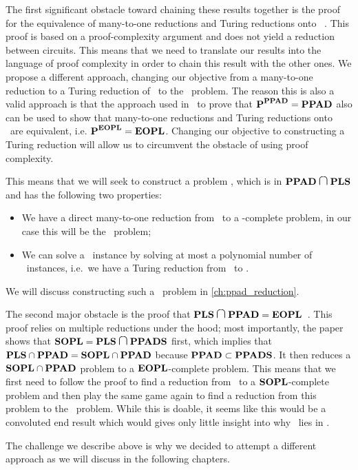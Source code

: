 The first significant obstacle toward chaining these results together is the proof for the equivalence of many-to-one reductions and Turing reductions onto \PPAD\ . This proof is based on a proof-complexity argument and does not yield a reduction between circuits. This means that we need to translate our results into the language of proof complexity in order to chain this result with the other ones. We propose a different approach, changing our objective from a many-to-one reduction to a Turing reduction of \Tarski\ to the \EndOfPotentialLine\ problem. The reason this is also a valid approach is that the approach used in~\cite{buss_propositional_2012} to prove that $\textbf{P}^{\textbf{PPAD}} = \textbf{PPAD}$ also can be used to show that many-to-one reductions and Turing reductions onto \EOPL\ are equivalent, i.e. $\textbf{P}^{\textbf{EOPL}} = \textbf{EOPL}$. Changing our objective to constructing a Turing reduction will allow us to circumvent the obstacle of using proof complexity.

This means that we will seek to construct a problem \Tarskistar, which is in $\PPAD  \medcap \PLS$ and has the following two properties:
\begin{itemize}
	\item We have a direct many-to-one reduction from \Tarskistar\ to a \PPAD-complete problem, in our case this will be the \EndOfLine\ problem;
	\item We can solve a \Tarski\ instance by solving at most a polynomial number of \Tarskistar\ instances, i.e.\ we have a Turing reduction from \Tarski\ to \Tarskistar.
\end{itemize}
We will discuss constructing such a \Tarskistar\ problem in \cref{ch:ppad_reduction}.

The second major obstacle is the proof that $\PLS \medcap \PPAD = \EOPL$~. This proof relies on multiple reductions under the hood; most importantly, the paper shows that $\SOPL = \PLS \medcap \PPADS$ first, which implies that $\textbf{PLS} \cap \textbf{PPAD} =  \textbf{SOPL} \cap \textbf{PPAD}$ because $\textbf{PPAD} \subset \textbf{PPADS}$. It then reduces a $\textbf{SOPL} \cap \textbf{PPAD}$ problem to a $\textbf{EOPL}$-complete problem. This means that we first need to follow the proof to find a reduction from \Tarskistar\ to a $\textbf{SOPL}$-complete problem and then play the same game again to find a reduction from this problem to the \EndOfPotentialLine\ problem. While this is doable, it seems like this would be a convoluted end result which would gives only little insight into why \Tarski\ lies in \EOPL\@.

The challenge we describe above is why we decided to attempt a different approach as we will discuss in the following chapters.